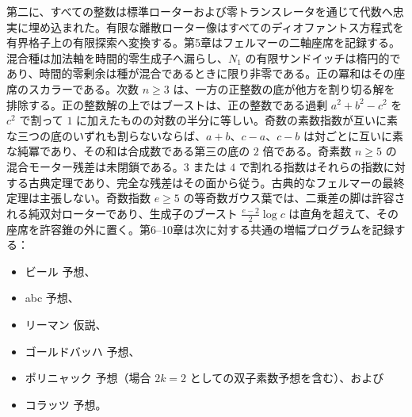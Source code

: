 \documentclass[a4paper]{article}
\theoremstyle{definition}
\theoremstyle{remark}
\begin{document}
第二に、すべての整数は標準ローターおよび零トランスレータを通じて代数へ忠実に埋め込まれた。有限な離散ローター像はすべてのディオファントス方程式を有界格子上の有限探索へ変換する。第5章はフェルマーの二軸座席を記録する。混合種は加法軸を時間的零生成子へ漏らし、\(N_1\) の有限サンドイッチは楕円的であり、時間的零剰余は種が混合であるときに限り非零である。正の冪和はその座席のスカラーである。次数 \(n\ge 3\) は、一方の正整数の底が他方を割り切る解を排除する。正の整数解の上ではブーストは、正の整数である過剰 \(a^2+b^2-c^2\) を \(c^2\) で割って \(1\) に加えたものの対数の半分に等しい。奇数の素数指数が互いに素な三つの底のいずれも割らないならば、\(a+b\)、\(c-a\)、\(c-b\) は対ごとに互いに素な純冪であり、その和は合成数である第三の底の \(2\) 倍である。奇素数 \(n\ge 5\) の混合モーター残差は未閉鎖である。\(3\) または \(4\) で割れる指数はそれらの指数に対する古典定理であり、完全な残差はその面から従う。古典的なフェルマーの最終定理は主張しない。奇数指数 \(e\ge 5\) の等奇数ガウス葉では、二乗差の脚は許容される純双対ローターであり、生成子のブースト \(\frac{e-2}{2}\log c\) は直角を超えて、その座席を許容錐の外に置く。第6--10章は次に対する共通の増幅プログラムを記録する：
\begin{itemize}
  \item ビール 予想、
  \item abc 予想、
  \item リーマン 仮説、
  \item ゴールドバッハ 予想、
  \item ポリニャック 予想（場合 \( 2k = 2 \) としての双子素数予想を含む）、および
  \item コラッツ 予想。
\end{itemize}
\end{document}
